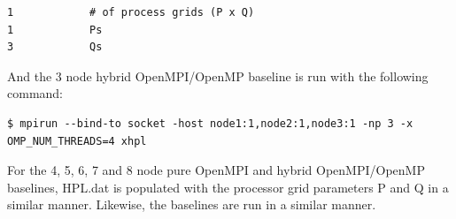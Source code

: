 \documentclass{report}
\begin{document}
\lstset{style=listing}
\begin{lstlisting}[numbers=none]
1            # of process grids (P x Q)
1            Ps
3            Qs
\end{lstlisting}

And the 3 node hybrid OpenMPI/OpenMP baseline is run with the following command:

\lstset{style=type}
\begin{lstlisting}[]
$ mpirun --bind-to socket -host node1:1,node2:1,node3:1 -np 3 -x OMP_NUM_THREADS=4 xhpl
\end{lstlisting}

For the 4, 5, 6, 7 and 8 node pure OpenMPI and hybrid OpenMPI/OpenMP baselines, HPL.dat is populated with the processor grid parameters P and Q in a similar manner. Likewise, the baselines are run in a similar manner.
\end{document}
